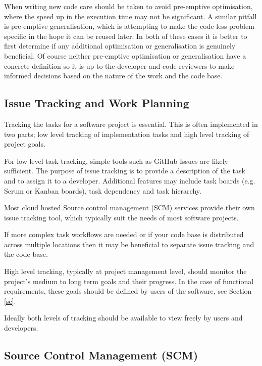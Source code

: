 \documentclass[jnr]{iosart2x}
\begin{document}
When writing new code care should be taken to avoid pre-emptive optimisation, where the speed up in the execution time may not be significant.
A similar pitfall is pre-emptive generalisation, which is attempting to make the code less problem specific in the hope it can be reused later.
In both of these cases it is better to first determine if any additional optimisation or generalisation is genuinely beneficial.
Of course neither pre-emptive optimisation or generalisation have a concrete definition so it is up to the developer and code reviewers to make informed decisions based on the nature of the work and the code base.

\subsection{Issue Tracking and Work Planning}
\label{Issue tracking and work planning}

Tracking the tasks for a software project is essential.
This is often implemented in two parts; low level tracking of implementation tasks and high level tracking of project goals.

For low level task tracking, simple tools such as GitHub Issues are likely sufficient.
The purpose of issue tracking is to provide a description of the task and to assign it to a developer.
Additional features may include task boards (e.g. Scrum or Kanban boards), task dependency and task hierarchy.

Most cloud hosted Source control management (SCM) services provide their own issue tracking tool, which typically suit the needs of most software projects.

If more complex task workflows are needed or if your code base is distributed across multiple locations then it may be beneficial to separate issue tracking and the code base.

High level tracking, typically at project management level, should monitor the project's medium to long term goals and their progress.
In the case of functional requirements, these goals should be defined by users of the software, see Section \ref{se}.

Ideally both levels of tracking should be available to view freely by users and developers.

\subsection{Source Control Management (SCM)}
\label{Source control management}
\end{document}
